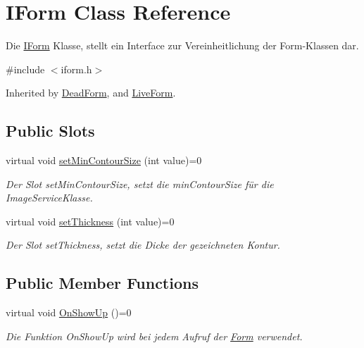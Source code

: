 \hypertarget{class_i_form}{}\section{I\+Form Class Reference}
\label{class_i_form}


Die \hyperlink{class_i_form}{I\+Form} Klasse, stellt ein Interface zur Vereinheitlichung der Form-\/\+Klassen dar.  




{\ttfamily \#include $<$iform.\+h$>$}



Inherited by \hyperlink{class_dead_form}{Dead\+Form}, and \hyperlink{class_live_form}{Live\+Form}.

\subsection*{Public Slots}
\begin{DoxyCompactItemize}
\item 
\hypertarget{class_i_form_abd736133676e8c801bc655069153828b}{}virtual void \hyperlink{class_i_form_abd736133676e8c801bc655069153828b}{set\+Min\+Contour\+Size} (int value)=0\label{class_i_form_abd736133676e8c801bc655069153828b}

\begin{DoxyCompactList}\small\item\em Der Slot set\+Min\+Contour\+Size, setzt die min\+Contour\+Size für die Image\+Service\+Klasse. \end{DoxyCompactList}\item 
\hypertarget{class_i_form_aedd14889765124bede68e5776588bdd9}{}virtual void \hyperlink{class_i_form_aedd14889765124bede68e5776588bdd9}{set\+Thickness} (int value)=0\label{class_i_form_aedd14889765124bede68e5776588bdd9}

\begin{DoxyCompactList}\small\item\em Der Slot set\+Thickness, setzt die Dicke der gezeichneten Kontur. \end{DoxyCompactList}\end{DoxyCompactItemize}
\subsection*{Public Member Functions}
\begin{DoxyCompactItemize}
\item 
\hypertarget{class_i_form_a423529532568fa6c0c14f82430f7f4a8}{}virtual void \hyperlink{class_i_form_a423529532568fa6c0c14f82430f7f4a8}{On\+Show\+Up} ()=0\label{class_i_form_a423529532568fa6c0c14f82430f7f4a8}

\begin{DoxyCompactList}\small\item\em Die Funktion On\+Show\+Up wird bei jedem Aufruf der \hyperlink{class_form}{Form} verwendet. \end{DoxyCompactList}\end{DoxyCompactItemize}


